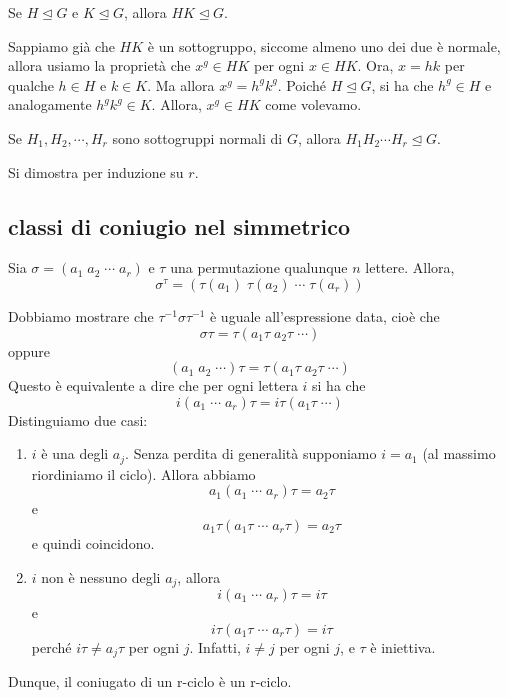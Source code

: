 \documentclass[a4paper]{article}
\begin{document}
\begin{snippetproposition}{}
    Se \(H \unlhd G\) e \(K \unlhd G\),
    allora \(HK \unlhd G\).
\end{snippetproposition}

\begin{snippetproof}{}
    Sappiamo già che \(HK\) è un sottogruppo, siccome almeno uno dei due è normale,
    allora usiamo la proprietà che \(x^g \in HK\) per ogni \(x\in HK\).
    Ora, \(x = hk\) per qualche \(h\in H\) e \(k\in K\).
    Ma allora \(x^g = h^gk^g\). Poiché \(H \unlhd G\), si ha che \(h^g \in H\)
    e analogamente \(h^g k^g \in K\).
    Allora, \(x^g \in HK\) come volevamo.
\end{snippetproof}

\begin{snippetcorollary}{}
    Se \(H_1, H_2, \cdots, H_r\) sono sottogruppi normali di \(G\),
    allora \(H_1H_2\cdots H_r \unlhd G\).
\end{snippetcorollary}

Si dimostra per induzione su \(r\).

\subsection{classi di coniugio nel simmetrico}

\begin{snippetlemma}{}
    Sia \(\sigma = (a_1\;a_2\;\cdots\;a_r)\)
    e \(\tau\) una permutazione qualunque \(n\) lettere.
    Allora,
    \[
        \sigma^\tau = (\tau(a_1)\;\tau(a_2)\;\cdots\;\tau(a_r))
    \]
\end{snippetlemma}

\begin{snippetproof}{}
    Dobbiamo mostrare che \(\tau^{-1} \sigma \tau^{-1}\) è uguale all'espressione data,
    cioè che
    \[
        \sigma \tau = \tau(a_1\tau\; a_2\tau\; \cdots)
    \]
    oppure
    \[
        (a_1\;a_2\;\cdots) \tau = \tau (a_1 \tau\; a_2\tau\; \cdots)
    \]
    Questo è equivalente a dire
    che per ogni lettera \(i\) si ha che
    \[
        i(a_1\; \cdots\; a_r) \tau = i\tau(a_1\tau\; \cdots)
    \]
    Distinguiamo due casi:
    \begin{enumerate}
        \item \(i\) è una degli \(a_j\). Senza perdita di generalità supponiamo
        \(i=a_1\) (al massimo riordiniamo il ciclo). Allora abbiamo
        \[
            a_1(a_1 \; \cdots \; a_r) \tau = a_2 \tau
        \]
        e
        \[
            a_1\tau(a_1\tau \; \cdots \; a_r\tau) = a_2 \tau
        \]
        e quindi coincidono.
        \item \(i\) non è nessuno degli \(a_j\), allora
        \[
            i(a_1\; \cdots \; a_r) \tau = i\tau
        \]
        e
        \[
            i\tau(a_1\tau\; \cdots \; a_r\tau) = i\tau
        \]
        perché \(i\tau \neq a_j\tau\) per ogni \(j\).
        Infatti, \(i \neq j\) per ogni \(j\), e \(\tau\) è iniettiva.
    \end{enumerate}
    Dunque, il coniugato di un r-ciclo è un r-ciclo.
\end{snippetproof}
\end{document}

